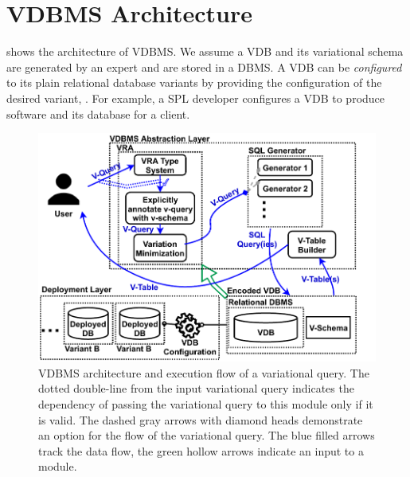 \section{VDBMS Architecture}
\label{sec:arch}

 shows the architecture of VDBMS.
We assume a VDB and its variational schema are generated by an 
expert and are stored in a DBMS.
A VDB can be \emph{configured} to its plain relational 
database variants
by providing the configuration
of the desired variant, .
For example, a SPL developer configures a VDB to produce 
software and its database for a client.


\begin{figure}
\includegraphics[width = \linewidth] {figs/arch/arch8.pdf}
\caption[VDBMS architecture and execution flow of a variational query]{VDBMS architecture and execution flow of a variational query. 
The dotted double-line from the input variational query
indicates the dependency of passing the variational query to this module
only if it is valid. 
The dashed gray arrows with diamond heads demonstrate
an option for the flow of the variational query. 
The blue filled arrows track the data flow, the green hollow arrows 
indicate an input to a module.}
\label{fig:arch}
\end{figure}


